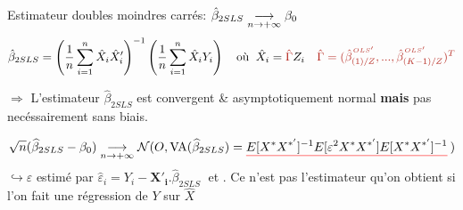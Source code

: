 \begin{boxH}
    Estimateur doubles moindres carrés: $\hat{\beta}_{2SLS} \underset{n \to +\infty}{\longrightarrow} \beta_{0}$
    \vspace*{-0.5cm}
    \begin{equation*}
        \hat{\beta}_{2SLS} = \left( \frac{1}{n}\sum_{i = 1}^{n}\hat{X}_{i}\hat{X}_{i}' \right)^{-1}\left( \frac{1}{n}\sum_{i = 1}^{n}\hat{X}_{i}Y_{i} \right) \quad \textrm{où} \;\; \hat{X}_{i} = \red{\hat{\Gamma}}Z_{i} \quad \red{\hat{\Gamma} = (\hat{\beta}^{\!^{\;OLS'}}_{(1)/Z},...,\hat{\beta}^{\!^{\;OLS'}}_{(K-1)/Z})^{T}}
        \vspace*{-0.25cm}
    \end{equation*}
    
    $\Rightarrow $ L'estimateur $\hat{\beta}_{2SLS}$ est convergent \& asymptotiquement normal \textbf{mais} pas necéssairement sans biais.
\end{boxH}
\vspace*{-1cm}
\begin{equation*}
    \sqrt{n}(\widehat{\beta}_{2SLS} - \beta_{0}) \cv \mathcal{N}(O,\textrm{VA($\widehat{\beta}_{2SLS}$)}=\redline{E[X^{*}X^{*'}]^{-1}E[\varepsilon^{2}X^{*}X^{*'}]E[X^{*}X^{*'}]^{-1}})
\end{equation*}
$\hookrightarrow \varepsilon$ estimé par $\widehat{\varepsilon}_{i} = Y_{i} - \boldsymbol{X'_{i}}.\widehat{\beta}_{2SLS} \;$ et . Ce n'est pas l'estimateur qu'on obtient si l'on fait une régression de $Y$ sur $\widehat{X}$ 